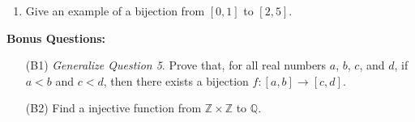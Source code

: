 \documentclass{article}
\begin{document}
\begin{enumerate}
	\item Give an example of a bijection from $[0,1]$ to $[2,5]$.
    \end{enumerate}

    \newpage
    \textbf{Bonus Questions:}

    \begin{itemize}

	\item [(B1)] \textit{Generalize Question 5}. Prove that, for all real numbers $a$, $b$, $c$, and $d$, if $a < b$ and $c < d$, then there exists a bijection $f : [a,b]     \rightarrow [c,d]$.

	\item [(B2)] Find a injective function from $\mathbb{Z} \times \mathbb{Z}$ to $\mathbb{Q}$.
    \end{itemize}
\end{document}
